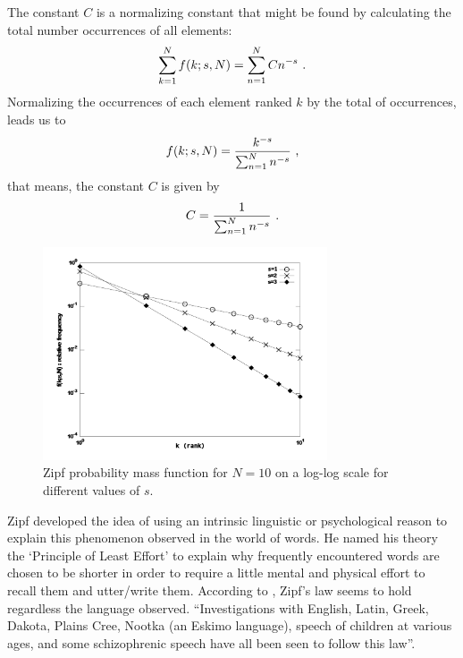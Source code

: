The constant $C$ is a normalizing constant that might be found by calculating 
the total number occurrences of all elements:
\begin{equation}
\sum_{k=1}^{N} f(k;s,N) = \sum_{n=1}^{N} C n^{-s} \textmd{ .}
\end{equation}
Normalizing the occurrences of each element ranked $k$ by the total of occurrences, leads us to
\begin{equation}
\label{eq:zipflaw}
f(k;s,N) = \frac{k^{-s}}{\sum_{n=1}^{N} n^{-s}} \textmd{ ,}
\end{equation}
that means, the constant $C$ is given by
\begin{equation}
C = \frac{1}{\sum_{n=1}^{N} n^{-s}} \textmd{ .}
\end{equation}

\begin{figure}[h!]
\centering
\includegraphics[width=0.75\textwidth]{images/zipf_pmf.pdf}
\caption{Zipf probability mass function for $N=10$ on a log-log scale for different values of $s$.}
\label{fig:zipf_pmf}
\end{figure} 

Zipf developed the idea of using an intrinsic linguistic or psychological reason to explain this phenomenon observed in the world of words. He named his theory the `Principle of Least Effort' to explain why frequently encountered words are chosen to be shorter in order to require a little mental and physical effort to recall them and utter/write them. According to \cite{weiss1998}, Zipf's law seems to hold regardless the language observed. ``Investigations with English, Latin, Greek, Dakota, Plains Cree, Nootka (an Eskimo language), speech of children at various ages, and some schizophrenic speech have all been seen to follow this law''\citep{weiss1998}.

